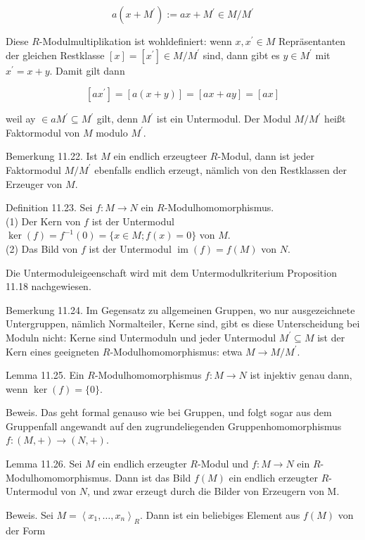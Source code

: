 \documentclass[10pt, letterpaper]{article}
\begin{document}
$$
a\left(x+M^{\prime}\right):=a x+M^{\prime} \in M / M^{\prime}
$$

Diese $R$-Modulmultiplikation ist wohldefiniert: wenn $x, x^{\prime} \in M$ Repräsentanten der gleichen Restklasse $[x]=\left[x^{\prime}\right] \in M / M^{\prime}$ sind, dann gibt es $y \in M^{\prime}$ mit $x^{\prime}=x+y$. Damit gilt dann

$$
\left[a x^{\prime}\right]=[a(x+y)]=[a x+a y]=[a x]
$$

weil ay $\in a M^{\prime} \subseteq M^{\prime}$ gilt, denn $M^{\prime}$ ist ein Untermodul. Der Modul $M / M^{\prime}$ heißt Faktormodul von $M$ modulo $M^{\prime}$.

Bemerkung 11.22. Ist $M$ ein endlich erzeugteer $R$-Modul, dann ist jeder Faktormodul $M / M^{\prime}$ ebenfalls endlich erzeugt, nämlich von den Restklassen der Erzeuger von $M$.

Definition 11.23. Sei $f: M \rightarrow N$ ein $R$-Modulhomomorphismus.\\
(1) Der Kern von $f$ ist der Untermodul $\operatorname{ker}(f)=f^{-1}(0)=\{x \in M ; f(x)=0\}$ von $M$.\\
(2) Das Bild von $f$ ist der Untermodul $\operatorname{im}(f)=f(M)$ von $N$.

Die Untermoduleigeenschaft wird mit dem Untermodulkriterium Proposition 11.18 nachgewiesen.

Bemerkung 11.24. Im Gegensatz zu allgemeinen Gruppen, wo nur ausgezeichnete Untergruppen, nämlich Normalteiler, Kerne sind, gibt es diese Unterscheidung bei Moduln nicht: Kerne sind Untermoduln und jeder Untermodul $M^{\prime} \subseteq M$ ist der Kern eines geeigneten $R$-Modulhomomorphismus: etwa $M \rightarrow M / M^{\prime}$.

Lemma 11.25. Ein $R$-Modulhomomorphismus $f: M \rightarrow N$ ist injektiv genau dann, wenn $\operatorname{ker}(f)=\{0\}$.

Beweis. Das geht formal genauso wie bei Gruppen, und folgt sogar aus dem Gruppenfall angewandt auf den zugrundeliegenden Gruppenhomomorphismus $f:(M,+) \rightarrow(N,+)$.

Lemma 11.26. Sei $M$ ein endlich erzeugter $R$-Modul und $f: M \rightarrow N$ ein $R$-Modulhomomorphismus. Dann ist das Bild $f(M)$ ein endlich erzeugter $R$-Untermodul von $N$, und zwar erzeugt durch die Bilder von Erzeugern von M.

Beweis. Sei $M=\left\langle x_{1}, \ldots, x_{n}\right\rangle_{R}$. Dann ist ein beliebiges Element aus $f(M)$ von der Form
\end{document}
